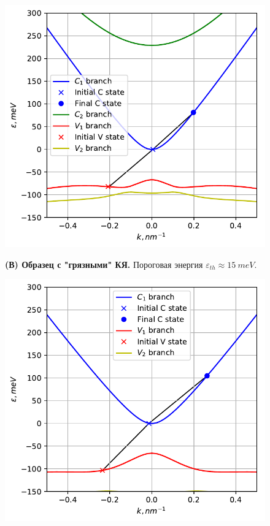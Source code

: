 \documentclass[../main.tex]{subfiles}
\begin{document}
        \begin{figure}[h!]
            \begin{minipage}[h]{0.49\linewidth}
                \begin{center}
                    \includegraphics[width=1.\linewidth]{./images/18u_impure_40K.pdf}
    
                    \textbf{(В) Образец с "грязными" КЯ.} Пороговая энергия 
                        $\varepsilon_{th} \approx 15~meV$.
                        \label{impure_18um}
                \end{center}
            \end{minipage}
            \hfill
            \begin{minipage}[h]{0.49\linewidth}
                \begin{center}
                    \includegraphics[width=1.\linewidth]{./images/18u_pure_40K.pdf}
    

\end{center}
\end{minipage}
\end{figure}
\end{document}
